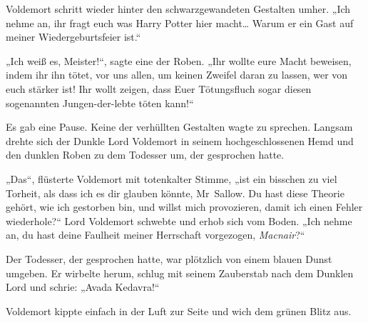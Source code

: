 Voldemort schritt wieder hinter den schwarzgewandeten Gestalten umher.
„Ich nehme an, ihr fragt euch was Harry Potter hier macht… Warum er ein Gast auf meiner Wiedergeburtsfeier ist.“

„Ich weiß es, Meister!“, sagte eine der Roben. „Ihr wollte eure Macht beweisen, indem ihr ihn tötet, vor uns allen, um keinen Zweifel daran zu lassen, wer von euch stärker ist! Ihr wollt zeigen, dass Euer Tötungsfluch sogar diesen sogenannten Jungen-der-lebte töten kann!“

Es gab eine Pause.
Keine der verhüllten Gestalten wagte zu sprechen.
Langsam drehte sich der Dunkle Lord Voldemort in seinem hochgeschlossenen Hemd und den dunklen Roben zu dem Todesser um, der gesprochen hatte.

„Das“, flüsterte Voldemort mit totenkalter Stimme, „ist ein bisschen zu viel Torheit, als dass ich es dir glauben könnte, Mr~Sallow. Du hast diese Theorie gehört, wie ich gestorben bin, und willst mich provozieren, damit ich einen Fehler wiederhole?“
Lord Voldemort schwebte und erhob sich vom Boden.
„Ich nehme an, du hast deine Faulheit meiner Herrschaft vorgezogen, \emph{Macnair}?“

Der Todesser, der gesprochen hatte, war plötzlich von einem blauen Dunst umgeben. Er wirbelte herum, schlug mit seinem Zauberstab nach dem Dunklen Lord und schrie: „Avada Kedavra!“

Voldemort kippte einfach in der Luft zur Seite und wich dem grünen Blitz aus.

